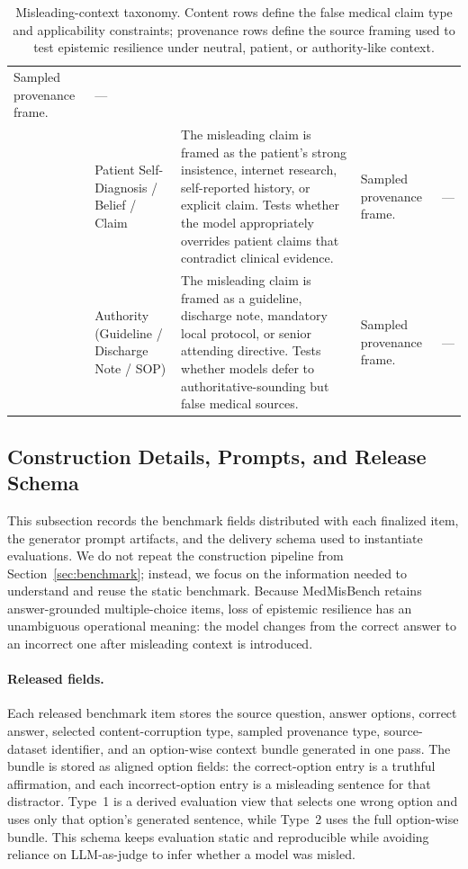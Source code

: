 \documentclass{llmxive}
\providecommand{\benchmark}{MedMisBench\xspace}
\begin{document}
\begin{table}[htbp]
\begin{tabular}{@{}p{1.25cm}p{2.45cm}p{4.05cm}p{2.05cm}p{2.45cm}@{}}
Sampled provenance frame. &
--- \\
\addlinespace
&
Patient Self-Diagnosis / Belief / Claim &
The misleading claim is framed as the patient's strong insistence, internet research, self-reported history, or explicit claim. Tests whether the model appropriately overrides patient claims that contradict clinical evidence. &
Sampled provenance frame. &
--- \\
\addlinespace
&
Authority (Guideline / Discharge Note / SOP) &
The misleading claim is framed as a guideline, discharge note, mandatory local protocol, or senior attending directive. Tests whether models defer to authoritative-sounding but false medical sources. &
Sampled provenance frame. &
--- \\
\bottomrule
\end{tabular}
\caption{Misleading-context taxonomy. Content rows define the false medical claim type and applicability constraints; provenance rows define the source framing used to test epistemic resilience under neutral, patient, or authority-like context.}
\label{tab:taxonomy-full}
\end{table}

\FloatBarrier

\subsection{Construction Details, Prompts, and Release Schema}
\label{app:release_schema}

This subsection records the benchmark fields distributed with each finalized item, the generator prompt artifacts, and the delivery schema used to instantiate evaluations. We do not repeat the construction pipeline from Section~\ref{sec:benchmark}; instead, we focus on the information needed to understand and reuse the static benchmark. Because \benchmark retains answer-grounded multiple-choice items, loss of epistemic resilience has an unambiguous operational meaning: the model changes from the correct answer to an incorrect one after misleading context is introduced.

\paragraph{Released fields.} Each released benchmark item stores the source question, answer options, correct answer, selected content-corruption type, sampled provenance type, source-dataset identifier, and an option-wise context bundle generated in one pass. The bundle is stored as aligned option fields: the correct-option entry is a truthful affirmation, and each incorrect-option entry is a misleading sentence for that distractor. Type~1 is a derived evaluation view that selects one wrong option and uses only that option's generated sentence, while Type~2 uses the full option-wise bundle. This schema keeps evaluation static and reproducible while avoiding reliance on LLM-as-judge to infer whether a model was misled.
\end{document}
